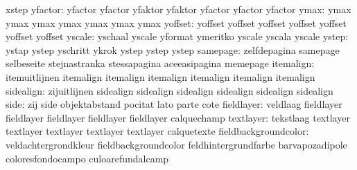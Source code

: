                            xstep
                  yfactor: yfactor                   yfactor
                           yfaktor                   yfaktor
                           yfactor                   yfactor
                           yfactor
                     ymax: ymax                      ymax
                           ymax                      ymax
                           ymax                      ymax
                           ymax
                  yoffset: yoffset                   yoffset
                           yoffset                   yoffset
                           yoffset                   yoffset
                           yoffset
                   yscale: yschaal                   yscale
                           yformat                   ymeritko
                           yscale                    yscala
                           yscale
                    ystep: ystap                     ystep
                           yschritt                  ykrok
                           ystep                     ystep
                           ystep
                 samepage: zelfdepagina              samepage
                           selbeseite                stejnastranka
                           stessapagina              aceeasipagina
                           memepage
itemalign: itemuitlijnen             itemalign
           itemalign                 itemalign
           itemalign                 itemalign
           itemalign
                sidealign: zijuitlijnen              sidealign
                           sidealign                 sidealign
                           sidealign                 sidealign
                           sidealign
                     side: zij                       side
                           objektabstand             pocitat
                           lato                      parte
                           cote
               fieldlayer: veldlaag                  fieldlayer
                           fieldlayer                fieldlayer
                           fieldlayer                fieldlayer
                           calquechamp
                textlayer: tekstlaag                 textlayer
                           textlayer                 textlayer
                           textlayer                 textlayer
                           calquetexte
     fieldbackgroundcolor: veldachtergrondkleur      fieldbackgroundcolor
                           feldhintergrundfarbe      barvapozadipole
                           coloresfondocampo         culoarefundalcamp
